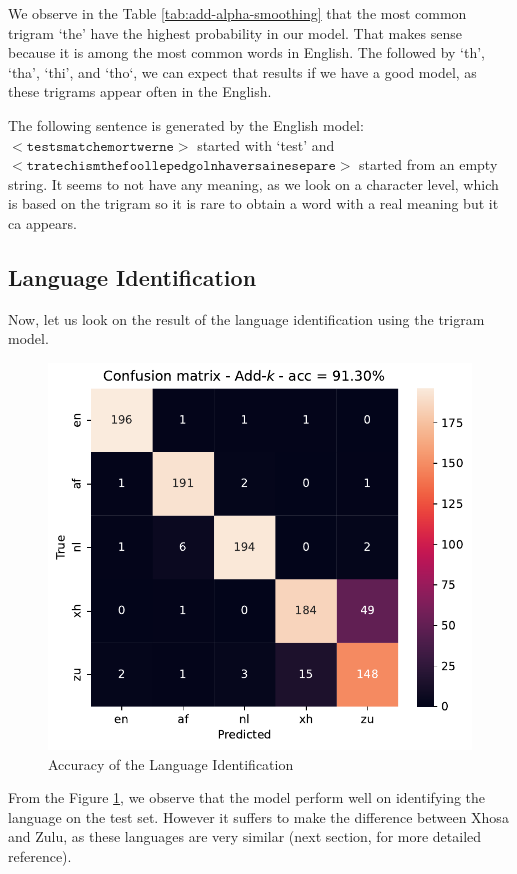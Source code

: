 We observe in the Table \ref{tab:add-alpha-smoothing} that the most common trigram `the' have the highest probability in our model. That makes sense because it is among the most common words in English. The followed by `th', `tha', `thi', and `tho`, we can expect that results if we have a good model, as these trigrams appear often in the English.


The following sentence is generated by the English model: $\mathtt{<tests mat che mort werne>}$ started with `test' and $\mathtt{<trate chism the foolle ped goln haversaines epare>}$ started from an empty string. It seems to  not have any meaning, as we look on a character level, which is based on the trigram so it is rare to obtain a word with a real meaning but it ca appears.
\subsection{Language Identification}
Now, let us look on the result of the language identification using the trigram model.
\begin{figure}[H]
	\centering
	\includegraphics[width=0.75\linewidth]{./figures/acc_lang.pdf}
	\caption{Accuracy of the Language Identification}
	\label{fig:lang-acc}
\end{figure}
From the Figure \ref{fig:lang-acc}, we observe that the model perform well on identifying the language on the test set.  However it suffers to make the difference between Xhosa and Zulu, as these languages are very similar (next section, for more detailed reference).


